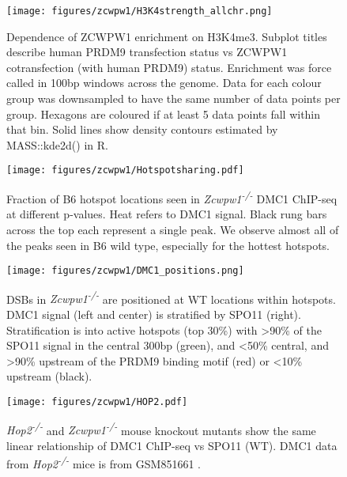 \begin{figure}[H]
	\centering
	\texttt{[image: figures/zcwpw1/H3K4strength\_allchr.png]}
	\caption[Relative H3K4me3 Strength]{
		Dependence of ZCWPW1 enrichment on H3K4me3. Subplot titles describe human PRDM9 transfection status vs ZCWPW1 cotransfection (with human PRDM9) status. Enrichment was force called in 100bp windows across the genome. Data for each colour group was downsampled to have the same number of data points per group. Hexagons are coloured if at least 5 data points fall within that bin. Solid lines show density contours estimated by MASS::kde2d() in R.
	}
	\label{fig:H3K4strength_denisty}
\end{figure}


\begin{figure}[H]
	\centering
	\texttt{[image: figures/zcwpw1/Hotspotsharing.pdf]}
	\caption[Hotspot Sharing]{
		Fraction of B6 hotspot locations seen in \textit{Zcwpw1\textsuperscript{-/-}} DMC1 ChIP-seq at different p-values. Heat refers to DMC1 signal. Black rung bars across the top each represent a single peak. We observe almost all of the peaks seen in B6 wild type, especially for the hottest hotspots.
	}
	\label{fig:hotspotsharing}
\end{figure}


\begin{figure}[H]
	\centering
	\texttt{[image: figures/zcwpw1/DMC1\_positions.png]}
	\caption[DMC1 positions]{
		DSBs in \textit{Zcwpw1\textsuperscript{-/-}} are positioned at WT locations within hotspots. DMC1 signal (left and center) is stratified by SPO11 (right). Stratification is into active hotspots (top 30\%) with >90\% of the SPO11 signal in the central 300bp (green), and <50\% central, and >90\% upstream of the PRDM9 binding motif (red) or <10\% upstream (black).
	}
	\label{fig:DMC1_positions}
\end{figure}


\begin{figure}[H]
	\centering
	\texttt{[image: figures/zcwpw1/HOP2.pdf]}
	\caption[HOP2 KO Phenocopying]{
		\textit{Hop2\textsuperscript{-/-}} and \textit{Zcwpw1\textsuperscript{-/-}} mouse knockout mutants show the same linear relationship of DMC1 ChIP-seq vs SPO11 (WT). DMC1 data from \textit{Hop2\textsuperscript{-/-}} mice is from GSM851661 \parencite{Khil2012Sensitive}.
	}
	\label{fig:HOP2}
\end{figure}


